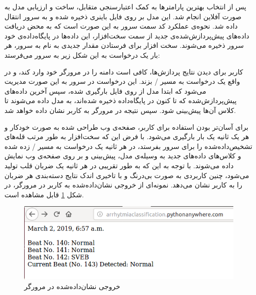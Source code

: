  پس از انتخاب بهترین پارامترها به کمک اعتبارسنجی متقابل، ساخت و ارزیابی مدل به صورت آفلاین انجام شد. این مدل بر روی فایل باینری ذخیره شده و به سرور انتقال داده شد. نحوه‌ی عملکرد کد سمت سرور به این صورت است که به محض دریافت داده‌‌های پیش‌پردازش‌شده‌ی جدید از سمت سخت‌افزار، این داده‌ها در پایگاه‌داده‌ی خود سرور ذخیره می‌شوند. سخت افزار برای فرستادن مقدار جدیدی به نام  به سرور، هر بار یک درخواست  به این شکل زیر به سرور می‌فرستد:
 
کاربر برای دیدن نتایج پردازش‌ها، کافی است  دامنه را در مرورگر خود وارد کند، و در واقع یک درخواست  به مسیر / بزند. این درخواست در سرور به این صورت مدیریت می‌شود که ابتدا مدل  از روی فایل بارگیری شده، سپس آخرین داده‌‌های پیش‌پردازش‌شده که تا کنون در پایگاه‌داده ذخیره شده‌اند، به مدل داده می‌شوند تا کلاس آن‌ها پیش‌بینی شود. سپس نتیجه در مرورگر به کاربر نشان داده خواهد شد. 
 
برای آسان‌تر بودن استفاده برای کاربر، صفحه‌ی وب طراحی شده به صورت خودکار و هر یک ثانیه یک بار بارگیری می‌شود. با فرض این که سخت‌افزار به طور مرتب قله‌های  تشخیص‌داده‌شده را برای سرور بفرستد، در هر ثانیه یک درخواست  به مسیر / زده شده و کلاس‌های داده‌های جدید به وسیله‌ی مدل، پیش‌بینی و بر روی صفحه‌ی وب نمایش داده می‌شوند. با توجه به این که به طور تقریبی در هر ثانیه یک ضربان قلب تولید می‌شود، چنین کاربردی به صورت بی‌درنگ و با تاخیری اندک نتایج دسته‌بندی هر ضربان را به کاربر نشان می‌دهد. نمونه‌ای از خروجی نشان‌داده‌شده به کاربر در مرورگر، در شکل \ref{fig:website} قابل مشاهده است.

\begin{figure}[!htb]
\centering
\includegraphics[width=15cm]{Figures/website.png}
\caption{خروجی نشان‌داده‌شده در مرورگر}
\label{fig:website}
\end{figure}	

